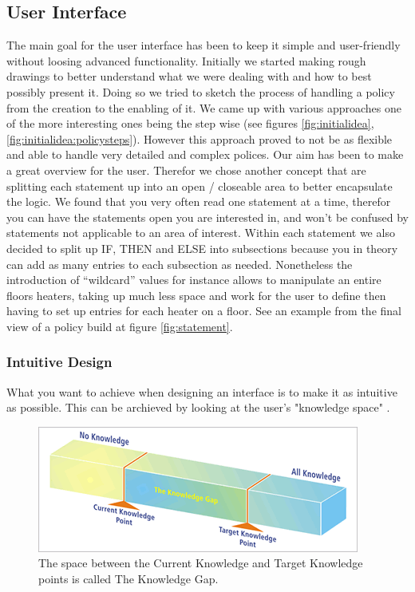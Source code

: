 \subsection{User Interface}
The main goal for the user interface has been to keep it simple and user-friendly without loosing advanced functionality. Initially we started making rough drawings to better understand what we were dealing with and how to best possibly present it. Doing so we tried to sketch the process of handling a policy from the creation to the enabling of it. We came up with various approaches one of the more interesting ones being the step wise (see figures \ref{fig:initialidea}, \ref{fig:initialidea:policysteps}). However this approach proved to not be as flexible and able to handle very detailed and complex polices. Our aim has been to make a great overview for the user. Therefor we chose another concept that are splitting each statement up into an open / closeable area to better encapsulate the logic. We found that you very often read one statement at a time, therefor you can have the statements open you are interested in, and won't be confused by statements not applicable to an area of interest. Within each statement we also decided to split up IF, THEN and ELSE into subsections because you in theory can add as many entries to each subsection as needed. Nonetheless the introduction of "`wildcard"' values for instance allows to manipulate an entire floors heaters, taking up much less space and work for the user to define then having to set up entries for each heater on a floor. See an example from the final view of a policy build at figure \ref{fig:statement}.

\subsubsection{Intuitive Design}
What you want to achieve when designing an interface is to make it as intuitive as possible. This can be archieved by looking at the user's "knowledge space" \cite{intuitivedesign}.

\begin{figure}[ht]
\centering
\includegraphics[width=\columnwidth]{knowledge-brick-3.png}
\caption{The space between the Current Knowledge and Target Knowledge points is called The Knowledge Gap.}
\label{fig:intuitivedesign}
\end{figure}

